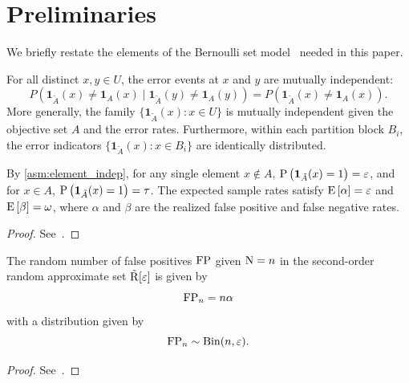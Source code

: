
\section{Preliminaries}
\label{sec:prelim}

We briefly restate the elements of the Bernoulli set model~\cite{bernoulliSets} needed in this paper.

\begin{axiom}
\label{asm:element_indep}
For all distinct $x, y \in U$, the error events at $x$ and $y$ are mutually independent:
\begin{equation}
P(\mathbf{1}_{\tilde{A}}(x) \neq \mathbf{1}_{A}(x) \mid \mathbf{1}_{\tilde{A}}(y) \neq \mathbf{1}_{A}(y)) =
	P(\mathbf{1}_{\tilde{A}}(x) \neq \mathbf{1}_{A}(x)).
\end{equation}
More generally, the family $\{\mathbf{1}_{\tilde{A}}(x) : x \in U\}$ is mutually independent given the objective set $A$ and the error rates.
Furthermore, within each partition block $B_i$, the error indicators $\{\mathbf{1}_{\tilde{A}}(x) : x \in B_i\}$ are identically distributed.
\end{axiom}

\begin{proposition}
\label{prop:element_rates}
By \cref{asm:element_indep}, for any single element $x \notin A$,
$\Prob{\mathbf{1}_{\tilde{A}}(x) = 1} = \fprate$, and for $x \in A$,
$\Prob{\mathbf{1}_{\tilde{A}}(x) = 1} = \tprate$.
The expected sample rates satisfy $\Expect{\alpha} = \fprate$ and $\Expect{\beta} = \fnrate$, where $\alpha$ and $\beta$ are the realized false positive and false negative rates.
\end{proposition}
\begin{proof}
See~\cite{bernoulliSets}.
\end{proof}

\begin{theorem}
\label{thm:fpbinom}
The random number of false positives $\mathrm{FP}$ given $\mathrm{N} = n$ in the second-order random approximate set $\tilde{\mathrm{R}}[\varepsilon]$ is given by
\begin{equation}
	\mathrm{FP}_n = n \alpha
\end{equation}
with a distribution given by
\begin{equation}
    \mathrm{FP}_n \sim \mathrm{Bin}(n, \varepsilon).
\end{equation}
\end{theorem}
\begin{proof}
See~\cite{bernoulliSets}.
\end{proof}

